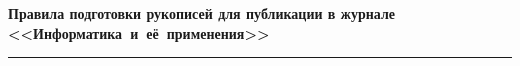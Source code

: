 

\def\stat{cont-rus}
{%
\vspace*{-24pt}
\raggedleft\Large \bf%
Правила подготовки рукописей  для публикации в журнале
<<Информатика~и~её~применения>> \vskip 8pt
    \hrule
    \par
{} }

\label{st\stat}

\def\tit{\ }

\def\aut{\ }
\def\auf{\ }

\def\leftkol{\ }

\def\rightkol{\ }


\titele{\tit}{\aut}{\auf}{\leftkol}{\rightkol}


